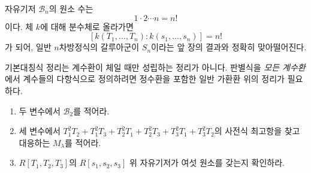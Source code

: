 \begin{remark}
자유기저 $\mathcal B_n$의 원소 수는
\[
  1\cdot2\cdots n=n!
\]
이다. 체 $k$에 대해 분수체로 올라가면
\[
  [k(T_1,\dots,T_n):k(s_1,\dots,s_n)]=n!
\]
가 되어, 일반 $n$차방정식의 갈루아군이 $S_n$이라는 앞 장의 결과와 정확히 맞아떨어진다.
\end{remark}

\begin{pitfall}
기본대칭식 정리는 계수환이 체일 때만 성립하는 정리가 아니다. 판별식을 \emph{모든 계수환}에서 계수들의 다항식으로 정의하려면 정수환을 포함한 일반 가환환 위의 정리가 필요하다.
\end{pitfall}

\begin{checkpoint}
\begin{enumerate}[label=(\alph*)]
  \item 두 변수에서 $\mathcal B_2$를 적어라.
  \item 세 변수에서 $T_1^2T_2+T_1^2T_3+T_2^2T_1+T_2^2T_3+T_3^2T_1+T_3^2T_2$의 사전식 최고항을 찾고 대응하는 $M_\lambda$를 적어라.
  \item $R[T_1,T_2,T_3]$의 $R[s_1,s_2,s_3]$ 위 자유기저가 여섯 원소를 갖는지 확인하라.
\end{enumerate}
\end{checkpoint}
